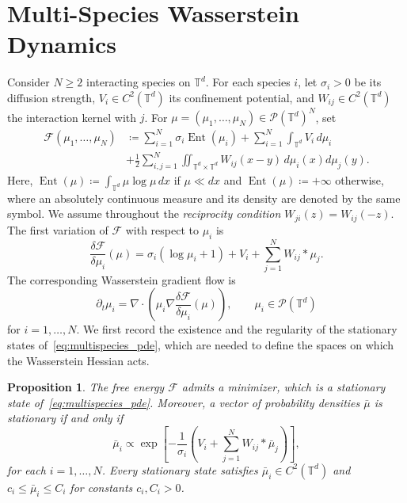 \documentclass[letterpaper, 10pt, conference]{ieeeconf}
\newtheorem{proposition}[theorem]{Proposition}
\newcommand{\T}{\mathbb{T}}
\newcommand{\Pcal}{\mathcal{P}}
\newcommand{\F}{\mathcal{F}}
\newcommand{\Ent}{\operatorname{Ent}}
\begin{document}
\section{Multi-Species Wasserstein Dynamics}
\label{sec:multispecies}

Consider $N \ge 2$ interacting species on $\T^d$.
For each species $i$, let $\sigma_i > 0$ be its diffusion strength, $V_i \in C^2(\T^d)$ its confinement potential, and $W_{ij} \in C^2(\T^d)$ the interaction kernel with $j$.
For $\mu = (\mu_1, \ldots, \mu_N) \in \Pcal(\T^d)^N$, set
\begin{equation*}
    \begin{aligned}
        \F(\mu_1, \ldots, \mu_N) &\coloneqq \sum_{i=1}^N \sigma_i \Ent(\mu_i) + \sum_{i=1}^N \int_{\T^d} V_i \, d\mu_i  \\
        &+ \frac{1}{2} \sum_{i,j=1}^N \iint_{\T^d \times \T^d} W_{ij}(x-y) \, d\mu_i(x) d\mu_j(y).
    \end{aligned}
\end{equation*}
Here, $\Ent(\mu) \coloneqq \int_{\T^d} \mu\log\mu\,dx$ if $\mu \ll dx$ and $\Ent(\mu) \coloneqq +\infty$ otherwise, where an absolutely continuous measure and its density are denoted by the same symbol.
We assume throughout the {\em reciprocity condition} $W_{ji}(z) = W_{ij}(-z)$.
The first variation of $\F$ with respect to $\mu_i$ is
\begin{equation}
    \label{eq:first_variation_ms}
    \frac{\delta\F}{\delta\mu_i}(\mu) = \sigma_i(\log\mu_i + 1) + V_i + \sum_{j=1}^N W_{ij} \ast \mu_j.
\end{equation}
The corresponding Wasserstein gradient flow is
\begin{equation}
    \label{eq:multispecies_pde}
    \partial_t\mu_i = \nabla \cdot \left(\mu_i \nabla\frac{\delta\F}{\delta\mu_i}(\mu)\right), \qquad \mu_i \in \Pcal(\T^d)
\end{equation}
for $i=1, \ldots, N$.
We first record the existence and the regularity of the stationary states of~\eqref{eq:multispecies_pde}, which are needed to define the spaces on which the Wasserstein Hessian acts.

\begin{proposition}
    \label{prop:stationary_states}
    The free energy $\F$ admits a minimizer, which is a stationary state of~\eqref{eq:multispecies_pde}.
        Moreover, a vector of probability densities $\bar\mu$ is stationary if and only if
        \begin{equation}
            \label{eq:kirkwood_monroe}
            \bar\mu_i \propto \exp\left[-\frac{1}{\sigma_i} \left(V_i + \sum_{j=1}^N W_{ij} \ast \bar\mu_j\right)\right],
        \end{equation}
        for each $i = 1, \ldots, N$.
        Every stationary state satisfies $\bar\mu_i \in C^2(\T^d)$ and $c_i \leq \bar\mu_i \leq C_i$ for constants $c_i, C_i > 0$.
\end{proposition}
\end{document}
